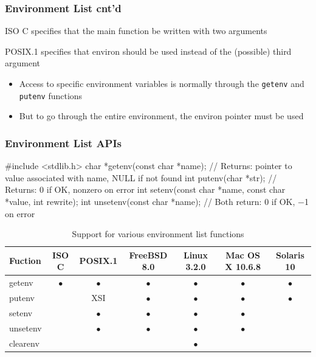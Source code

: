 \documentclass[newPxFont,sthlmFooter,nooffset]{beamer}
\begin{document}
\begin{frame}[t]
  \frametitle{Environment List cnt'd}
ISO C specifies that the main function be written with two arguments

POSIX.1 specifies that environ should be used instead of the (possible) third argument
\begin{itemize}
\item Access to specific environment variables is normally through the
  \texttt{getenv} and \texttt{putenv} functions
\item But to go through the entire environment, the environ pointer must be used
\end{itemize}

\end{frame}



\begin{frame}[containsverbatim,t]
  \frametitle{Environment List APIs}

\begin{codedef}
#include <stdlib.h>
char *getenv(const char *name);
// Returns: pointer to value associated with name, NULL if not found  
int putenv(char *str);
// Returns: 0 if OK, nonzero on error
int setenv(const char *name, const char *value, int rewrite); 
int unsetenv(const char *name);
// Both return: 0 if OK, −1 on error
\end{codedef}
{\footnotesize
\begin{table}[h]
  \centering
  \begin{tabular}{l | c c | *{4}{c}  }
    Fuction & ISO C & POSIX.1 & \parbox{5em}{\centering FreeBSD 8.0} & \parbox{5ex}{\centering Linux 3.2.0} & \parbox{5em}{\centering Mac OS X 10.6.8} & \parbox{5em}{\centering Solaris 10} \\ \hline \hline
    getenv  & $\bullet$ & $\bullet$ & $\bullet$ & $\bullet$ & $\bullet$ & $\bullet$ \\  
    putenv  &           &   XSI     & $\bullet$ & $\bullet$ & $\bullet$ & $\bullet$ \\  
    setenv  &           & $\bullet$ & $\bullet$ & $\bullet$ & $\bullet$ &           \\  
  unsetenv  &           & $\bullet$ & $\bullet$ & $\bullet$ & $\bullet$ &           \\  
  clearenv  &           &           &           & $\bullet$ &           &           \\
  \end{tabular}
  \caption{Support for various environment list functions}
  \label{tab:support}
\end{table}
}
\end{frame}
\end{document}
